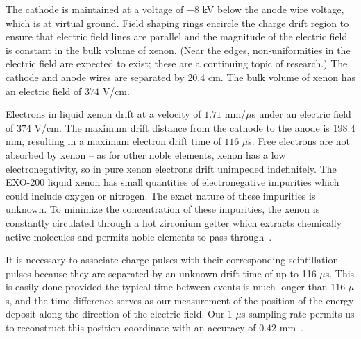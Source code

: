 The cathode is maintained at a voltage of $-8$ kV below the anode wire voltage, which is at virtual ground.  Field shaping rings encircle the charge drift region to ensure that electric field lines are parallel and the magnitude of the electric field is constant in the bulk volume of xenon.  (Near the edges, non-uniformities in the electric field are expected to exist; these are a continuing topic of research.)  The cathode and anode wires are separated by $20.4$ cm. The bulk volume of xenon has an electric field of $374$ V/cm.

Electrons in liquid xenon drift at a velocity of $1.71$ mm/$\mu$s under an electric field of $374$ V/cm.  The maximum drift distance from the cathode to the anode is $198.4$ mm, resulting in a maximum electron drift time of $116$ $\mu$s.  Free electrons are not absorbed by xenon -- as for other noble elements, xenon has a low electronegativity, so in pure xenon electrons drift unimpeded indefinitely.  The EXO-200 liquid xenon has small quantities of electronegative impurities which could include oxygen or nitrogen.  The exact nature of these impurities is unknown.  To minimize the concentration of these impurities, the xenon is constantly circulated through a hot zirconium getter which extracts chemically active molecules and permits noble elements to pass through~\cite{detectorPartI}.

It is necessary to associate charge pulses with their corresponding scintillation pulses because they are separated by an unknown drift time of up to 116 $\mu$s.  This is easily done provided the typical time between events is much longer than $116$ $\mu$s, and the time difference serves as our measurement of the position of the energy deposit along the direction of the electric field.  Our 1 $\mu$s sampling rate permits us to reconstruct this position coordinate with an accuracy of $0.42$ mm~\cite{bb2nEXO2014}.


